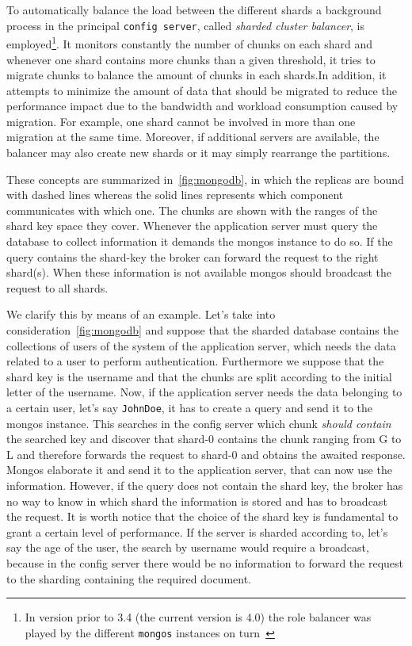 To automatically balance the load between the different shards a background 
process in the principal \texttt{config server}, called \emph{sharded cluster 
balancer}, 
is employed\footnote{In version prior to 3.4 (the current version is 4.0) the
role balancer was played by the different \texttt{mongos} 
instances on turn~\cite{bib:mongodb-docs}}. It monitors constantly the number
of chunks on each shard and  whenever one  shard contains more chunks than a 
given threshold, it tries to migrate chunks to balance the amount of chunks
in each shards.In addition, it attempts to minimize the amount of data 
that should be migrated to reduce the performance impact due to the bandwidth 
and workload consumption caused by migration. For example, one shard cannot be 
involved in more than one migration at the same time. Moreover, if additional 
servers are available, the balancer may also create new shards or it may simply 
rearrange the partitions.

These concepts are summarized in~\autoref{fig:mongodb}, in which the replicas
are bound with dashed lines whereas the solid lines represents which
component communicates with which one. The chunks are shown with the
ranges of the shard key space they cover.
Whenever the application server must query the database to collect information
it demands the mongos instance to do so. If the query contains the shard-key
the broker can forward the request to the right shard(s). When these information
is not available mongos should broadcast the request to all shards.

We clarify this by means of an example. Let's take into 
consideration~\autoref{fig:mongodb} and suppose that the sharded database
contains the collections of users of the system of the application server,
which needs the data related to a user to perform authentication.
Furthermore we suppose that the shard key is the username and that the chunks
are split according to the initial letter of the username. Now, if the 
application server needs the data belonging to a certain user, let's say 
\texttt{JohnDoe}, it has to create a query and send it to the mongos instance. 
This searches in the config server which chunk \emph{should contain} the
searched key and discover that shard-0 contains the chunk ranging from G to L 
and therefore forwards the request to shard-0 and obtains the awaited response.
Mongos elaborate it and send it to the application server, that can now use
the information. However, if the query does not contain the shard key, the 
broker has no way to know in which shard the information is stored and has to
broadcast the request.
It is worth notice that the choice of the shard key is fundamental to grant a 
certain level of performance. If the server is sharded according to, let's say 
the age of the user, the search by username would require a broadcast, because
in the config server there would be no information to forward the request to 
the sharding containing the required document.



